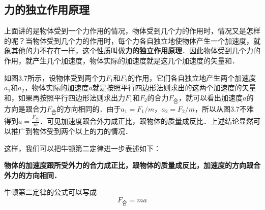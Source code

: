 \subsection{力的独立作用原理}
上面讲的是物体受到一个力作用的情况，物体受到几个力的作用时，情况又是怎样的呢？当物体受到几个力的作用时，每个力各自独立地使物体产生一个加速度，就象其他的力不存在一样，这个性质叫做\textbf{力的独立作用原理}．因此物体受到几个力的作用，就产生几个加速度，物体实际的加速度就是这几个加速度的矢量和．
\begin{figure}[htp]\centering
{}
\caption{}
\end{figure}

如图3.7所示，设物体受到两个力$F_1$和$F_2$的作用，它们各自独立地产生两个加速度$a_1$和$a_2$，物体实际的加速度$a$就是按照平行四边形法则求出的这两个加速度的矢量和，如果再按照平行四边形法则求出力$F_1$和$F_2$的合力$F_{\text{合}}$，就可以看出加速度$a$的方向是跟合力$F_{\text{合}}$的方向相同的．由于$a_1=F_1/m$，$a_2=F_2/m$，所以从图3.7不难得到$a=\frac{F_{\text{合}}}{m}$．可见加速度跟合外力成正比，跟物体的质量成反比．上述结论显然可以推广到物体受到两个以上的力的情况．

这样，我们可以把牛顿第二定律进一步表述如下：

\textbf{物体的加速度跟所受外力的合力成正比，跟物体的质量成反比，加速度的方向跟合外力的方向相同．}

牛顿第二定律的公式可以写成
\[F_{\text{合}}=ma\]


